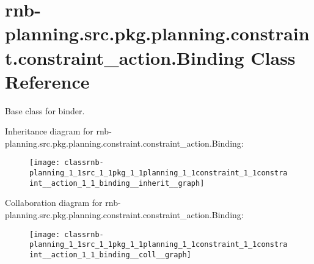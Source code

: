 \hypertarget{classrnb-planning_1_1src_1_1pkg_1_1planning_1_1constraint_1_1constraint__action_1_1_binding}{}\section{rnb-\/planning.src.\+pkg.\+planning.\+constraint.\+constraint\+\_\+action.\+Binding Class Reference}
\label{classrnb-planning_1_1src_1_1pkg_1_1planning_1_1constraint_1_1constraint__action_1_1_binding}


Base class for binder.  




Inheritance diagram for rnb-\/planning.src.\+pkg.\+planning.\+constraint.\+constraint\+\_\+action.\+Binding\+:
\nopagebreak
\begin{figure}[H]
\begin{center}
\leavevmode
\texttt{[image: classrnb-planning\_1\_1src\_1\_1pkg\_1\_1planning\_1\_1constraint\_1\_1constraint\_\_action\_1\_1\_binding\_\_inherit\_\_graph]}
\end{center}
\end{figure}


Collaboration diagram for rnb-\/planning.src.\+pkg.\+planning.\+constraint.\+constraint\+\_\+action.\+Binding\+:
\nopagebreak
\begin{figure}[H]
\begin{center}
\leavevmode
\texttt{[image: classrnb-planning\_1\_1src\_1\_1pkg\_1\_1planning\_1\_1constraint\_1\_1constraint\_\_action\_1\_1\_binding\_\_coll\_\_graph]}
\end{center}
\end{figure}
